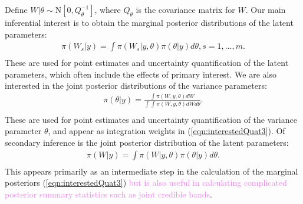 \documentclass[ba]{imsart}
\newcommand{\alex}[1]{\textcolor{violet}{{ }#1}}
\begin{document}
Define $W|\theta\sim\text{N}\left[ 0,Q^{-1}_{\theta}\right]$, where $Q_{\theta}$ is the covariance matrix for $W$. Our main inferential interest is to obtain the marginal posterior distributions of the latent parameters:
\begin{equation}\begin{aligned}\label{eqn:interestedQuat3}
\pi(W_{s}|y) = \int \pi(W_{s}|y,\theta) \pi(\theta|y) d\theta, s = 1,\ldots,m .  \\
\end{aligned}\end{equation}
These are used for point estimates and uncertainty quantification of the latent parameters, which often include the effects of primary interest. We are also interested in the joint posterior distributions of the variance parameters:
\begin{equation}\begin{aligned}\label{eqn:interestedQuat1}
\pi(\theta|y) = \frac{\int \pi(W,y,\theta) dW}{\int_{} \int_{} \pi(W,y,\theta) dW d\theta } . \\
\end{aligned}\end{equation}
These are used for point estimates and uncertainty quantification of the variance parameter $\theta$, and appear as integration weights in (\ref{eqn:interestedQuat3}). Of secondary inference is the joint posterior distribution of the latent parameters:
\begin{equation}\begin{aligned}\label{eqn:interestedQuat2}
\pi(W|y) = \int \pi(W|y,\theta) \pi(\theta|y) d\theta .  \\
\end{aligned}\end{equation}
This appears primarily as an intermediate step in the calculation of the marginal posteriors (\ref{eqn:interestedQuat3})\alex{but is also useful in calculating complicated posterior summary statistics such as joint credible bands}.
\end{document}
